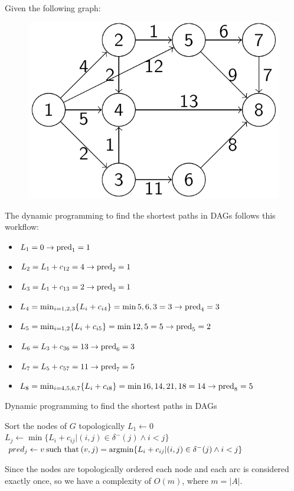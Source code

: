 \documentclass[12pt, a4paper]{report}
\begin{document}
    \begin{example}
        Given the following graph: 
        \begin{figure}[H]
            \centering
            \includegraphics[width=0.5\linewidth]{images/DAG.png}
        \end{figure}
        The dynamic programming to find the shortest paths in DAGs follows this workflow: 
        \begin{itemize}
            \item $L_1=0 \rightarrow \textnormal{pred}_1=1$
            \item $L_2=L_1+c_{12}=4 \rightarrow \textnormal{pred}_2=1$
            \item $L_3=L_1+c_{13}=2 \rightarrow \textnormal{pred}_3=1$
            \item $L_4=\min_{i=1,2,3}\{L_i+c_{i4}\}=\min{5,6,3}=3 \rightarrow \textnormal{pred}_4=3$
            \item $L_5=\min_{i=1,2}\{L_i+c_{i5}\}=\min{12,5}=5 \rightarrow \textnormal{pred}_5=2$
            \item $L_6=L_3+c_{36}=13 \rightarrow \textnormal{pred}_6=3$
            \item $L_7=L_5+c_{57}=11 \rightarrow \textnormal{pred}_7=5$
            \item $L_8=\min_{i=4,5,6,7}\{L_i+c_{i8}\}=\min{16,14,21,18}=14 \rightarrow \textnormal{pred}_8=5$
        \end{itemize}
    \end{example}
    \begin{algorithm}[H]
        \caption{Dynamic programming to find the shortest paths in DAGs}
            \begin{algorithmic}[1]
                \State Sort the nodes of $G$ topologically
                \State $L_1 \leftarrow 0$
                    \State $L_j \leftarrow \min\{L_i+c_{ij}|(i,j) \in \delta^{-}(j) \land i < j\}$
                    \State $pred_j \leftarrow v \: \textnormal{such that} \: (v,j)=\textnormal{argmin} \{L_i+c_{ij}|(i,j) \in \delta^{-}(j) \land i < j\}$
                \EndFor
            \end{algorithmic}
    \end{algorithm}
    Since the nodes are topologically ordered each node and each arc is considered exactly once, so we have a complexity of $O(m)$, where $m=\left\lvert A \right\rvert$. 
    
\end{document}

